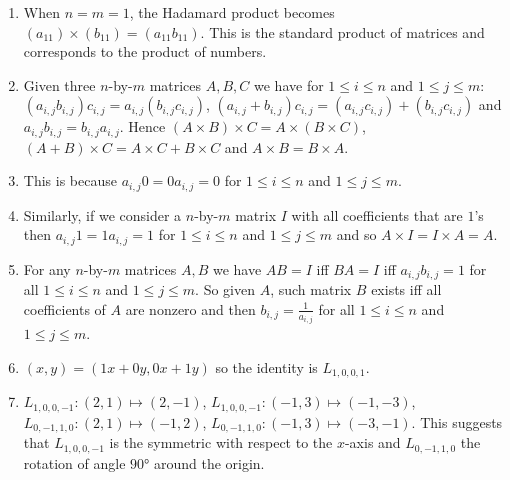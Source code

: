 \begin{enumerate}
\item When $n = m = 1$, the Hadamard product becomes
  ${(a_{11})} \times {(b_{11})} = {(a_{11}b_{11})}$. This is the standard
  product of matrices and corresponds to the product of numbers.
\item Given three $n$-by-$m$ matrices $A, B, C$ we have
  for $1 \leq i \leq n$ and $1 \leq j \leq m$:
  ${(a_{i,j} b_{i,j})} c_{i,j} = a_{i,j} {(b_{i,j} c_{i,j})}$,
  ${(a_{i,j} + b_{i,j})} c_{i,j} = {(a_{i,j}c_{i,j})} + {(b_{i,j}c_{i,j})}$ and
  $a_{i,j} b_{i,j} = b_{i,j} a_{i,j}$. Hence
  ${(A \times B)} \times C = A \times {(B \times C)}$,
  ${(A+B)}\times C = {A\times C} + {B\times C}$ and
  $A\times B = B\times A$.
\item This is because
  $a_{i,j} 0 = 0 a_{i,j} = 0$ for $1 \leq i \leq n$ and $1 \leq j \leq m$.
\item Similarly, if we consider a $n$-by-$m$ matrix $I$ with all coefficients
  that are $1$'s then
  $a_{i,j} 1 = 1 a_{i,j} = 1$ for $1 \leq i \leq n$ and $1 \leq j \leq m$
  and so $A \times I = I \times A = A$.
\item For any $n$-by-$m$ matrices $A, B$ we have
  $A B = I$ iff $B A = I$ iff
  $a_{i,j} b_{i,j} = 1$ for all $1 \leq i \leq n$ and $1 \leq j \leq m$.
  So given $A$, such matrix $B$ exists iff
  all coefficients of $A$ are nonzero and then $b_{i,j} = \frac{1}{a_{i,j}}$
  for all $1 \leq i \leq n$ and $1 \leq j \leq m$.
\item $(x,y) = ({1x+0y}, {0x+1y})$ so the identity is
  $L_{1,0,0,1}$.
\item $L_{1,0,0,-1}: (2,1) \mapsto (2,-1)$,
  $L_{1,0,0,-1}: (-1,3) \mapsto (-1,-3)$,
  $L_{0,-1,1,0}: (2,1) \mapsto (-1,2)$,
  $L_{0,-1,1,0}: (-1,3) \mapsto (-3,-1)$.
  This suggests that $L_{1,0,0,-1}$ is the symmetric with respect to the $x$-axis
  and $L_{0,-1,1,0}$ the rotation of angle $90°$ around the origin.
\begin{center}
\end{center}
\end{enumerate}
